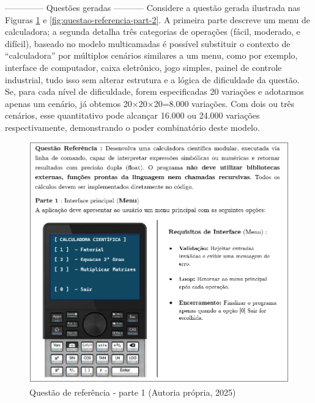 --------------  Questões geradas -----------
Considere a questão gerada ilustrada nas Figuras \ref{fig:questao-referencia-part-1} e \ref{fig:questao-referencia-part-2}. A primeira parte descreve um menu de calculadora; a segunda detalha três categorias de operações (fácil, moderado, e difícil), baseado no modelo multicamadas é possível substituir o contexto de “calculadora” por múltiplos cenários similares a um menu, como por exemplo, interface de computador, caixa eletrônico, jogo simples, painel de controle industrial, tudo isso sem alterar estrutura e a lógica de dificuldade da questão. Se, para cada nível de dificuldade, forem especificadas 20 variações e adotarmos apenas um cenário, já obtemos 20×20×20=8.000 variações. Com dois ou três cenários, esse quantitativo pode alcançar 16.000 ou 24.000 variações respectivamente, demonstrando o poder combinatório deste modelo.


\begin{figure}[ht]
	\centering
	\includegraphics[width=12cm]{./imagens/capitulo4/questao-referencia-1.png}
	\caption{Questão de referência - parte 1 (Autoria própria, 2025)}
	\label{fig:questao-referencia-part-1}
\end{figure}


